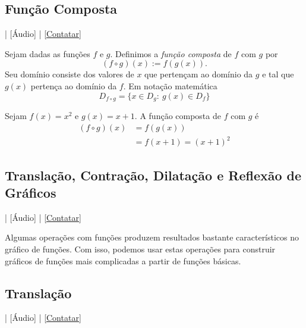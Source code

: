 \subsection{Função Composta}

\begin{flushright}
  [Vídeo] | [Áudio] | \href{https://phkonzen.github.io/notas/contato.html}{[Contatar]}
\end{flushright}

Sejam dadas as funções $f$ e $g$. Definimos a \emph{função composta} de $f$ com $g$ por
\begin{equation}
  (f\circ g)(x) := f\left(g(x)\right).
\end{equation}
Seu domínio consiste dos valores de $x$ que pertençam ao domínio da $g$ e tal que $g(x)$ pertença ao domínio da $f$. Em notação matemática
\begin{equation}
  D_{f\circ g} = \{x\in D_g:~g(x)\in D_f\}
\end{equation}

\begin{ex}
  Sejam $f(x) = x^2$ e $g(x) = x+1$. A função composta de $f$ com $g$ é
  \begin{align}
    (f\circ g)(x) &= f\left(g(x)\right)\\
                  &= f(x+1) = (x+1)^2
  \end{align}
\end{ex}

\subsection{Translação, Contração, Dilatação e Reflexão de Gráficos}

\begin{flushright}
  [Vídeo] | [Áudio] | \href{https://phkonzen.github.io/notas/contato.html}{[Contatar]}
\end{flushright}

Algumas operações com funções produzem resultados bastante característicos no gráfico de funções. Com isso, podemos usar estas operações para construir gráficos de funções mais complicadas a partir de funções básicas.

\subsection{Translação}

\begin{flushright}
  [Vídeo] | [Áudio] | \href{https://phkonzen.github.io/notas/contato.html}{[Contatar]}
\end{flushright}

